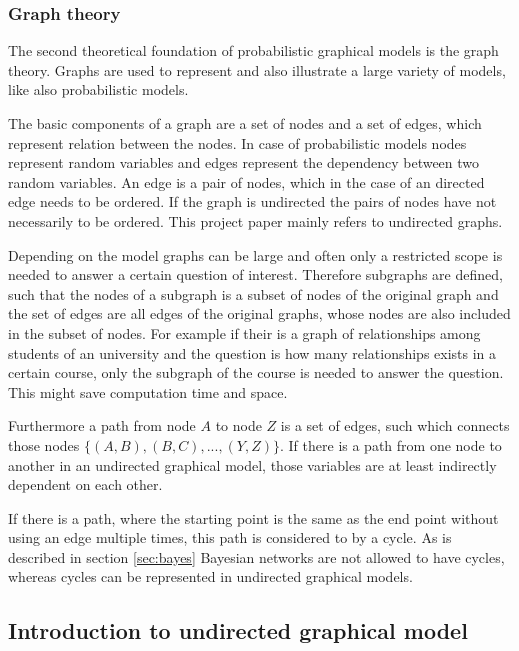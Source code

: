 \subsubsection{Graph theory} \label{sec:graph}

The second theoretical foundation of probabilistic graphical models is the graph theory. Graphs are used to represent and also illustrate a large variety of models, like also probabilistic models.

The basic components of a graph are a set of nodes and a set of edges, which represent relation between the nodes. In case of probabilistic models nodes represent random variables and edges represent the dependency between two random variables. An edge is a pair of nodes, which in the case of an directed edge needs to be ordered. If the graph is undirected the pairs of nodes have not necessarily to be ordered. This project paper mainly refers to undirected graphs.

Depending on the model graphs can be large and often only a restricted scope is needed to answer a certain question of interest. Therefore subgraphs are defined, such that the nodes of a subgraph is a subset of nodes of the original graph and the set of edges are all edges of the original graphs, whose nodes are also included in the subset of nodes. For example if their is a graph of relationships among students of an university and the question is how many relationships exists in a certain course, only the subgraph of the course is needed to answer the question. This might save computation time and space.

Furthermore a path from node $A$ to node $Z$ is a set of edges, such which connects those nodes $\{(A,B),(B,C),...,(Y,Z)\}$. If there is a path from one node to another in an undirected graphical model, those variables are at least indirectly dependent on each other.

If there is a path, where the starting point is the same as the end point without using an edge multiple times, this path is considered to by a cycle. As is described in section \ref{sec:bayes} Bayesian networks are not allowed to have cycles, whereas cycles can be represented in undirected graphical models.

\subsection{Introduction to undirected graphical model} \label{sec:introugm}

